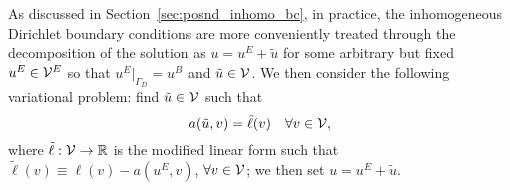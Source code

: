 As discussed in Section~\ref{sec:posnd_inhomo_bc}, in practice, the inhomogeneous Dirichlet boundary conditions are more conveniently treated through the decomposition of the solution as $u = u^E + \tilde u$ for some arbitrary but fixed $u^E \in \mathcal{V}^E$ so that $u^E|_{\Gamma_D} = u^B$ and $\tilde u \in \mathcal{V}$.  We then consider the following variational problem: find $\tilde u \in \mathcal{V}$ such that
\begin{equation*}
  a(\tilde u,v) = \tilde \ell(v) \quad \forall v \in \mathcal{V},
\end{equation*}
where $\tilde \ell: \mathcal{V} \to \mathbb{R}$ is the modified linear form such that $\tilde \ell(v) \equiv \ell(v) - a(u^E,v)$, $\forall v \in \mathcal{V}$; we then set $u = u^E + \tilde u$. 


